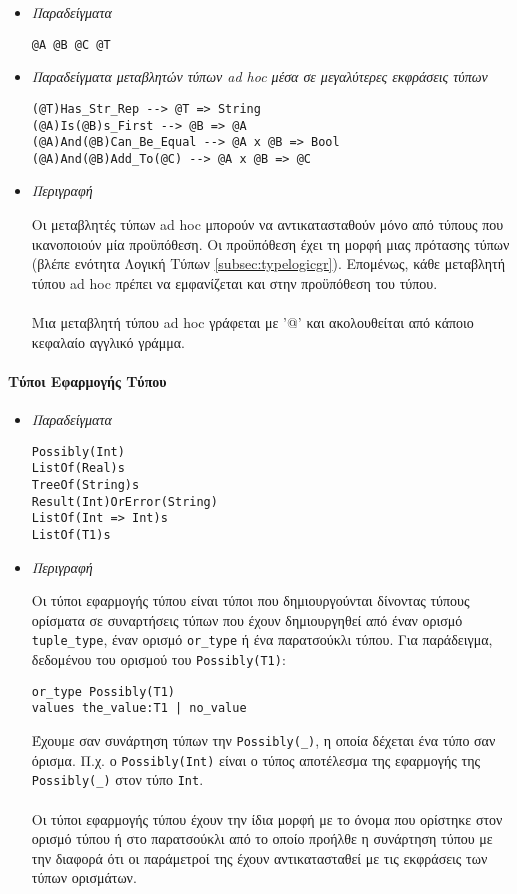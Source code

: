 \documentclass[diploma]{softlab-thesis}
\begin{document}
\begin{itemize}
\item \textit{Παραδείγματα}
\begin{verbatim}
@A @B @C @T
\end{verbatim}

\item
\textit{
Παραδείγματα μεταβλητών τύπων ad hoc μέσα σε μεγαλύτερες εκφράσεις τύπων
}
\begin{verbatim}
(@T)Has_Str_Rep --> @T => String
(@A)Is(@B)s_First --> @B => @A
(@A)And(@B)Can_Be_Equal --> @A x @B => Bool
(@A)And(@B)Add_To(@C) --> @A x @B => @C
\end{verbatim}

\item \textit{Περιγραφή}

Οι μεταβλητές τύπων ad hoc μπορούν να αντικατασταθούν μόνο από τύπους
που ικανοποιούν μία προϋπόθεση. Οι προϋπόθεση έχει τη μορφή μιας πρότασης
τύπων (βλέπε ενότητα Λογική Τύπων \ref{subsec:typelogicgr}).
Επομένως, κάθε μεταβλητή τύπου ad hoc πρέπει να εμφανίζεται και στην
προϋπόθεση του τύπου.
\\\\
Μια μεταβλητή τύπου ad hoc γράφεται με '@' και ακολουθείται από κάποιο
κεφαλαίο αγγλικό γράμμα.

\end{itemize}

\paragraph{Τύποι Εφαρμογής Τύπου}

\begin{itemize}
\item \textit{Παραδείγματα}
\begin{verbatim}
Possibly(Int)
ListOf(Real)s
TreeOf(String)s
Result(Int)OrError(String)
ListOf(Int => Int)s
ListOf(T1)s
\end{verbatim}

\item \textit{Περιγραφή}

Οι τύποι εφαρμογής τύπου είναι τύποι που δημιουργούνται δίνοντας τύπους
ορίσματα σε συναρτήσεις τύπων που έχουν δημιουργηθεί από έναν ορισμό
\verb|tuple_type|, έναν ορισμό \verb|or_type| ή ένα παρατσούκλι τύπου.
Για παράδειγμα, δεδομένου του ορισμού του \verb|Possibly(T1)|:
\begin{verbatim}
or_type Possibly(T1)
values the_value:T1 | no_value
\end{verbatim}
Έχουμε σαν συνάρτηση τύπων την \verb|Possibly(_)|, η οποία δέχεται ένα τύπο
σαν όρισμα. Π.χ. ο \verb|Possibly(Int)| είναι ο τύπος αποτέλεσμα της εφαρμογής
της \verb|Possibly(_)| στον τύπο \verb|Int|.
\\\\
Οι τύποι εφαρμογής τύπου έχουν την ίδια μορφή με το όνομα που ορίστηκε στον
ορισμό τύπου ή στο παρατσούκλι από το οποίο προήλθε η συνάρτηση τύπου με την
διαφορά ότι οι παράμετροί της έχουν αντικατασταθεί με τις εκφράσεις των τύπων
ορισμάτων.

\end{itemize}
\end{document}
